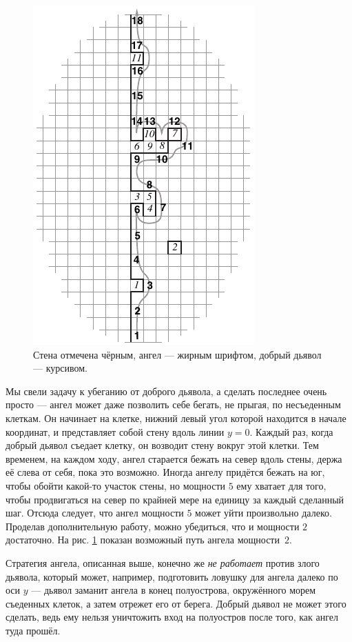 \begin{figure}[htb!]
\centering
\includegraphics[scale=1]{pics/angel}
\caption{Стена отмечена чёрным, ангел --- жирным шрифтом, добрый дьявол --- курсивом.}
\label{pic:angel}
\end{figure}

Мы свели задачу к убеганию от доброго дьявола, а сделать последнее очень просто ---
ангел может даже позволить себе бегать, не прыгая, по несъеденным клеткам.
Он начинает на клетке, нижний левый угол которой находится в начале координат, и представляет собой стену вдоль линии $y = 0$.
Каждый раз, когда добрый дьявол съедает клетку, он возводит стену вокруг этой клетки.
Тем временем, на каждом ходу, ангел старается бежать на север вдоль стены, держа её слева от себя, пока это возможно.
Иногда ангелу придётся бежать на юг, чтобы обойти какой-то участок стены, но мощности $5$ 
ему хватает для того, чтобы продвигаться на север по крайней мере на единицу за каждый сделанный шаг.
Отсюда следует, что ангел мощности $5$ может уйти произвольно далеко.
Проделав дополнительную работу, можно убедиться, что и мощности $2$ достаточно.
На рис. \ref{pic:angel} показан возможный путь ангела мощности~$2$.

Стратегия ангела, описанная выше, конечно же \emph{не работает} против злого дьявола, который может, например, подготовить ловушку для ангела далеко по оси $y$ --- дьявол заманит ангела в конец полуострова, окружённого морем съеденных клеток, а затем отрежет его от берега.
Добрый дьявол не может этого сделать, ведь ему нельзя уничтожить вход на полуостров после того, как ангел туда прошёл.

